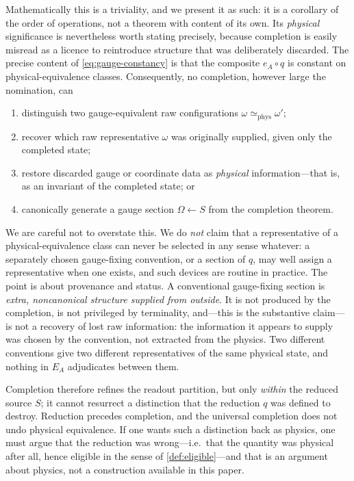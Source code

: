 \documentclass[11pt,reqno]{amsart}
\theoremstyle{plain}
\theoremstyle{definition}
\theoremstyle{remark}
\numberwithin{equation}{section}
\begin{document}
Mathematically this is a triviality, and we present it as such: it is a corollary of the order of
operations, not a theorem with content of its own. Its \emph{physical} significance is nevertheless
worth stating precisely, because completion is easily misread as a licence to reintroduce structure
that was deliberately discarded. The precise content of \eqref{eq:gauge-constancy} is that the
composite $e_A\circ q$ is constant on physical-equivalence classes. Consequently, no completion,
however large the nomination, can
\begin{enumerate}
\item distinguish two gauge-equivalent raw configurations $\omega\simeq_{\mathrm{phys}}\omega'$;
\item recover which raw representative $\omega$ was originally supplied, given only the completed
state;
\item restore discarded gauge or coordinate data as \emph{physical} information---that is, as an
invariant of the completed state; or
\item canonically generate a gauge section $\Omega\leftarrow S$ from the completion theorem.
\end{enumerate}
We are careful not to overstate this. We do \emph{not} claim that a representative of a
physical-equivalence class can never be selected in any sense whatever: a separately chosen
gauge-fixing convention, or a section of $q$, may well assign a representative when one exists, and
such devices are routine in practice. The point is about provenance and status. A conventional
gauge-fixing section is \emph{extra, noncanonical structure supplied from outside}. It is not
produced by the completion, is not privileged by terminality, and---this is the substantive
claim---is not a recovery of lost raw information: the information it appears to supply was chosen by
the convention, not extracted from the physics. Two different conventions give two different
representatives of the same physical state, and nothing in $E_A$ adjudicates between them.

Completion therefore refines the readout partition, but only \emph{within} the reduced source $S$;
it cannot resurrect a distinction that the reduction $q$ was defined to destroy. Reduction precedes
completion, and the universal completion does not undo physical equivalence. If one wants such a
distinction back as physics, one must argue that the reduction was wrong---i.e.\ that the quantity
was physical after all, hence eligible in the sense of \cref{def:eligible}---and that is an argument
about physics, not a construction available in this paper.
\end{document}
